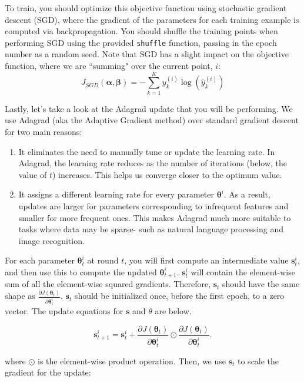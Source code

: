 \documentclass[11pt,addpoints,answers]{exam}
\newcommand{\sv}{\mathbf{s}}
\newcommand{\alphav     }{\boldsymbol \alpha     }
\newcommand{\betav      }{\boldsymbol \beta      }
\newcommand{\thetav     }{\boldsymbol \theta     }
\begin{document}
To train, you should optimize this objective function using stochastic gradient descent (SGD), where the gradient of the parameters for each training example is computed via backpropagation. You should shuffle the training points when performing SGD using the provided \verb|shuffle| function, passing in the epoch number as a random seed. Note that SGD has a slight impact on the objective function, where we are ``summing" over the current point, $i$:
\begin{equation}
\label{eq:sgd_celoss}
J_{SGD}(\alphav, \betav)= -\sum_{k=1}^{K} y_k^{(i)} \log (\hat{y}^{(i)}_k)
\end{equation}

\clearpage Lastly, let's take a look at the Adagrad update that you will be performing. We use Adagrad (aka the Adaptive Gradient method) over standard gradient descent for two main reasons:

\begin{enumerate}
    \item It eliminates the need to manually tune or update the learning rate. In Adagrad, the learning rate reduces as the number of iterations (below, the value of $t$) increases. This helps us converge closer to the optimum value.
    \item It assigns a different learning rate for every parameter $\thetav^i$. As a result, updates are larger for parameters corresponding to infrequent features and smaller for more frequent ones. This makes Adagrad much more suitable to tasks where data may be sparse- such as natural language processing and image recognition.
\end{enumerate}

For each parameter $\thetav^i_t$ at round $t$, you will first compute an intermediate value $\sv^i_t$, and then use this to compute the updated $\thetav^i_{t+1}$.
$\sv^i_t$ will contain the element-wise sum of all the element-wise squared gradients. Therefore, $\sv_t$ should have the same shape as $\frac{\partial J(\thetav_{t})}{\partial \thetav^i_t}$. $\sv_t$ should be initialized once, before the first epoch, to a zero vector. The update equations for $\sv$ and $\theta$ are below.

\begin{equation}
    \label{eq:adagrad_s}
    \sv^i_{t+1} = \sv^i_{t} + \frac{\partial J(\thetav_{t})}{\partial \thetav^i_t} \odot \frac{\partial J(\thetav_{t})}{\partial \thetav^i_t}.
\end{equation}

where $\odot$ is the element-wise product operation. Then, we use $\sv_t$ to scale the gradient for the update:
\end{document}
